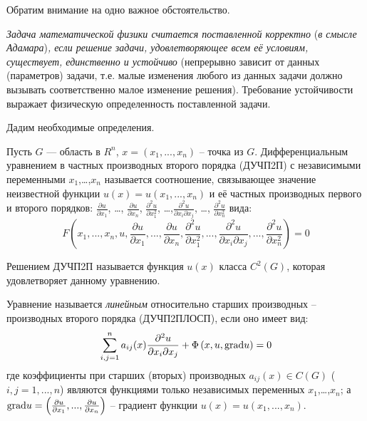 \bigskip

Обратим внимание на одно важное обстоятельство.

\textit{Задача математической физики считается поставленной корректно }(\textit{в смысле Адамара})\textit{, если решение задачи, удовлетворяющее всем её условиям, существует, единственно и устойчиво} (непрерывно зависит от данных (параметров) задачи, т.е. малые изменения любого из данных задачи должно вызывать соответственно малое изменение решения). Требование устойчивости выражает физическую определенность поставленной задачи.

\bigskip

Дадим необходимые определения.

\begin{definition}
	Пусть $G$ --- область в $\mathit{R}^{n} $, $x=(x_{1} ,...,x_{n} )$ -- точка из $G$. Дифференциальным уравнением в частных производных второго порядка (ДУЧП2П) с независимыми переменными $x_{1} $,{\dots},$x_{n} $ называется соотношение, связывающее значение неизвестной функции $u(x)=u(x_{1} ,...,x_{n} )$ и её частных производных первого и второго порядков:
	$\frac{\partial u}{\partial x_{1} } $, {\dots}, $\frac{\partial u}{\partial x_{n} } $, $\frac{\partial ^{2} u}{\partial x_{1}^{2} } $, {\dots},$\frac{\partial ^{2} u}{\partial x_{i} \partial x_{j} } $, {\dots}, $\frac{\partial ^{2} u}{\partial x_{n}^{2} } $
	вида:
	\[F\left(x_{1} ,...,x_{n} ,u,\frac{\partial u}{\partial x_{1} } ,...,\frac{\partial u}{\partial x_{n} } ,\frac{\partial ^{2} u}{\partial x_{1}^{2} } ,...,\frac{\partial ^{2} u}{\partial x_{i} \partial x_{j} } ,...,\frac{\partial ^{2} u}{\partial x_{n}^{2} } \right)=0\]
\end{definition}

\begin{definition}
	Решением ДУЧП2П называется функция $u(x)$ класса $C^{2} (G)$, которая удовлетворяет данному уравнению.
\end{definition}

\begin{definition}
	Уравнение называется \textit{линейным} относительно старших производных -- производных второго порядка (ДУЧП2ПЛОСП), если оно имеет вид:
	\[\sum _{i,j=1}^{n}a_{ij} (x)\frac{\partial ^{2} u}{\partial x_{i} \partial x_{j} }  +\Phi \left(x,u,{\rm grad}u\right)=0\]
	где коэффициенты при старших (вторых) производных $a_{ij} (x)\in C(G)$ ($i,j=1,...,n$) являются функциями только независимых переменных $x_{1} $,{\dots},$x_{n} $; а ${\rm grad}u=\left(\frac{\partial u}{\partial x_{1} } ,...,\frac{\partial u}{\partial x_{n} } \right)$ -- градиент функции $u(x)=u(x_{1} ,...,x_{n} )$.
\end{definition}


